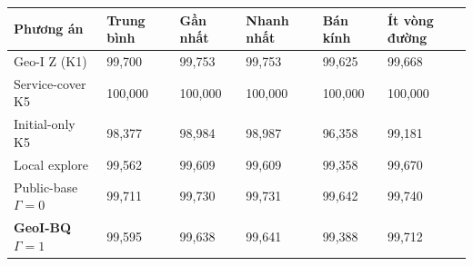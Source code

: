 \par\smallskip\noindent\begin{tabularx}{\linewidth}{@{}P{4.2cm}XXXXX@{}}\toprule
\textbf{Phương án} & \textbf{Trung bình} & \textbf{Gần nhất} & \textbf{Nhanh nhất} & \textbf{Bán kính} & \textbf{Ít vòng đường} \\
\midrule
Geo-I Z (K1) & 99{,}700 & 99{,}753 & 99{,}753 & 99{,}625 & 99{,}668 \\
Service-cover K5 & 100{,}000 & 100{,}000 & 100{,}000 & 100{,}000 & 100{,}000 \\
Initial-only K5 & 98{,}377 & 98{,}984 & 98{,}987 & 96{,}358 & 99{,}181 \\
Local explore & 99{,}562 & 99{,}609 & 99{,}609 & 99{,}358 & 99{,}670 \\
Public-base $\Gamma=0$ & 99{,}711 & 99{,}730 & 99{,}731 & 99{,}642 & 99{,}740 \\
\textbf{GeoI-BQ $\Gamma=1$} & 99{,}595 & 99{,}638 & 99{,}641 & 99{,}388 & 99{,}712 \\
\bottomrule\end{tabularx}\par\smallskip

